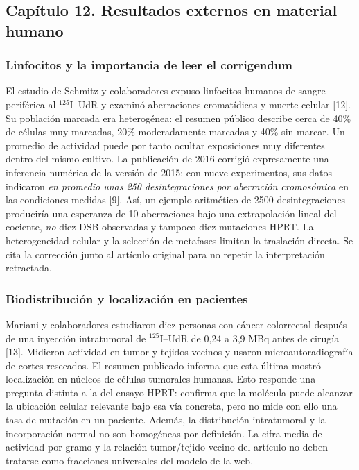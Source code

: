 \clearpage
\subsection{Capítulo 12. Resultados externos en material humano}
\label{ampliacion-evidencia}

\subsubsection{Linfocitos y la importancia de leer el corrigendum}
El estudio de Schmitz y colaboradores expuso linfocitos humanos de sangre
periférica al $^{125}$I--UdR y examinó aberraciones cromatídicas y muerte
celular [12]. Su población marcada era heterogénea: el resumen público
describe cerca de 40\% de células muy marcadas, 20\% moderadamente
marcadas y 40\% sin marcar. Un promedio de actividad puede por tanto
ocultar exposiciones muy diferentes dentro del mismo cultivo. La
publicación de 2016 corrigió expresamente una inferencia numérica de la
versión de 2015: con nueve experimentos, sus datos indicaron \emph{en
promedio unas 250 desintegraciones por aberración cromosómica} en las
condiciones medidas [9]. Así, un ejemplo aritmético de 2500
desintegraciones produciría una esperanza de 10 aberraciones bajo una
extrapolación lineal del cociente, \emph{no} diez DSB observadas y tampoco
diez mutaciones HPRT. La heterogeneidad celular y la selección de
metafases limitan la traslación directa. Se cita la corrección junto al
artículo original para no repetir la interpretación retractada.

\subsubsection{Biodistribución y localización en pacientes}
Mariani y colaboradores estudiaron diez personas con cáncer colorrectal
después de una inyección intratumoral de $^{125}$I--UdR de 0,24 a
3,9 MBq antes de cirugía [13]. Midieron actividad en tumor y tejidos
vecinos y usaron microautoradiografía de cortes resecados. El resumen
publicado informa que esta última mostró localización en núcleos de
células tumorales humanas. Esto responde una pregunta distinta a la del
ensayo HPRT: confirma que la molécula puede alcanzar la ubicación
celular relevante bajo esa vía concreta, pero no mide con ello una tasa
de mutación en un paciente. Además, la distribución intratumoral y la
incorporación normal no son homogéneas por definición. La cifra media
de actividad por gramo y la relación tumor/tejido vecino del artículo
no deben tratarse como fracciones universales del modelo de la web.

